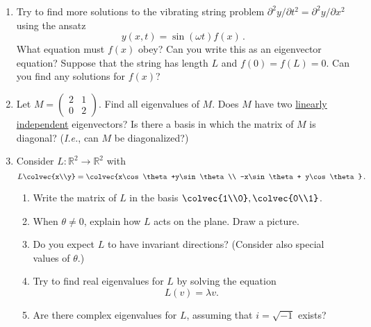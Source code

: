 

\begin{enumerate}
\item \label{stringval} Try to find more solutions to the vibrating string problem $\partial^2 y/\partial t^2=\partial^2 y/\partial x^2$
using the ansatz
\[
y(x,t)=\sin(\omega t) f(x)\, . 
\]
What equation must $f(x)$ obey? Can you write this as an eigenvector equation? Suppose that the string has length $L$ and $f(0)=f(L)=0$.
Can you find any solutions for $f(x)$?

\item Let $M=\begin{pmatrix}
2 & 1 \\
0 & 2
\end{pmatrix}$.  Find all eigenvalues of $M$.  Does $M$ have two \hyperref[independent]{linearly independent} eigenvectors?  
Is there a basis in which the matrix of $M$ is diagonal? ({\itshape I.e.}, can $M$ be diagonalized?)


\item Consider $L \colon \mathbb{R}^2\rightarrow \mathbb{R}^2$ with \[L\colvec{x\\y}
=\colvec{x\cos \theta +y\sin \theta\\ -x\sin \theta + y\cos \theta}\, .\]
\begin{enumerate}
\item Write the matrix of $L$ in the basis $\colvec{1\\0}, \colvec{0\\1}$.

\item When $\theta\neq 0$, explain how $L$ acts on the plane.  Draw a picture.

\item Do you expect $L$ to have invariant directions? (Consider also special values of $\theta$.)

\item Try to find real eigenvalues for $L$ by solving the equation 
\[
L(v)=\lambda v.
\]

\item Are there complex eigenvalues for $L$, assuming that $i=\sqrt{-1}$ exists?
\end{enumerate}



\end{enumerate}
